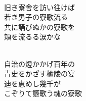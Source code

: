 \documentclass[10pt,b5j]{tarticle} %
\begin{document}
\begin{enumerate}
\begin{minipage}[c]{\blocksize}
    \end{minipage}
    \begin{minipage}[c]{\blocksize}
        
        \vspace{\linespace}
        \item~\\
        旧き寮舎を訪い往けば\\
        若き男子の寮歌流る\\
        共に誦びぬかの寮歌を\\
        頬を流るる涙かな
        
    \end{minipage}
    \begin{minipage}[c]{\blocksize}
        
        \vspace{\linespace}
        \item~\\
        自治の燈かかげ百年の\\
        青史をかざす楡陵の宴\\
        迪を恵めし幾千が\\
        こぞりて謳歌う魂の寮歌
    
    \end{minipage}
\end{enumerate} %
\end{document}
